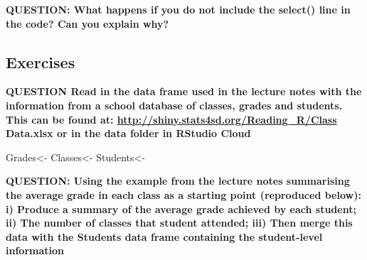 \documentclass[]{book}
\newenvironment{Shaded}{\begin{snugshade}}{\end{snugshade}}
\newcommand{\DataTypeTok}[1]{\textcolor[rgb]{0.13,0.29,0.53}{#1}}
\newcommand{\KeywordTok}[1]{\textcolor[rgb]{0.13,0.29,0.53}{\textbf{#1}}}
\newcommand{\NormalTok}[1]{#1}
\newcommand{\OperatorTok}[1]{\textcolor[rgb]{0.81,0.36,0.00}{\textbf{#1}}}
\newcommand{\StringTok}[1]{\textcolor[rgb]{0.31,0.60,0.02}{#1}}
\begin{document}
\textbf{QUESTION: What happens if you do not include the select() line in the code? Can you explain why?}

\begin{Shaded}
\end{Shaded}

\hypertarget{exercises}{%
\subsection{Exercises}\label{exercises}}

\textbf{QUESTION Read in the data frame used in the lecture notes with the information from a school database of classes, grades and students. This can be found at: \url{http://shiny.stats4sd.org/Reading_R/Class} Data.xlsx or in the data folder in RStudio Cloud}

\begin{Shaded}
\begin{Highlighting}[]
\NormalTok{Grades<-}
\NormalTok{Classes<-}
\NormalTok{Students<-}
\end{Highlighting}
\end{Shaded}

\textbf{QUESTION: Using the example from the lecture notes summarising the average grade in each class as a starting point (reproduced below): i) Produce a summary of the average grade achieved by each student; ii) The number of classes that student attended; iii) Then merge this data with the Students data frame containing the student-level information}

\begin{Shaded}
\end{Shaded}
\end{document}
